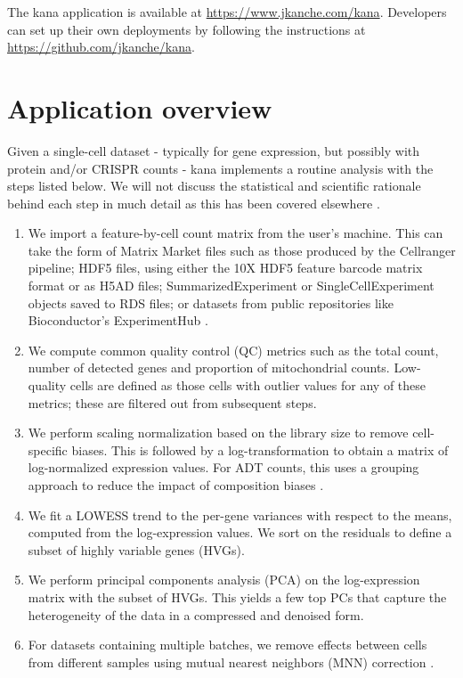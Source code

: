 \documentclass{article}
\begin{document}
The kana application is available at \url{https://www.jkanche.com/kana}.
Developers can set up their own deployments by following the instructions at \url{https://github.com/jkanche/kana}.

\section{Application overview}

Given a single-cell dataset - typically for gene expression, but possibly with protein and/or CRISPR counts - kana implements a routine analysis with the steps listed below.
We will not discuss the statistical and scientific rationale behind each step in much detail as this has been covered elsewhere \cite{oscabook}.

\begin{enumerate}
\item We import a feature-by-cell count matrix from the user's machine.
This can take the form of Matrix Market files such as those produced by the Cellranger pipeline;
HDF5 files, using either the 10X HDF5 feature barcode matrix format or as H5AD files; 
SummarizedExperiment or SingleCellExperiment objects \cite{amezquita2020orchestrating} saved to RDS files;
or datasets from public repositories like Bioconductor's ExperimentHub \cite{morgan2019experimenthub}.
\item We compute common quality control (QC) metrics such as the total count, number of detected genes and proportion of mitochondrial counts.
Low-quality cells are defined as those cells with outlier values for any of these metrics; these are filtered out from subsequent steps.
\item We perform scaling normalization based on the library size to remove cell-specific biases.
This is followed by a log-transformation to obtain a matrix of log-normalized expression values.
For ADT counts, this uses a grouping approach to reduce the impact of composition biases \cite{lun2016pooling}.
\item We fit a LOWESS trend \cite{cleveland1979robust} to the per-gene variances with respect to the means, computed from the log-expression values.
We sort on the residuals to define a subset of highly variable genes (HVGs). 
\item We perform principal components analysis (PCA) on the log-expression matrix with the subset of HVGs.
This yields a few top PCs that capture the heterogeneity of the data in a compressed and denoised form.
\item For datasets containing multiple batches, we remove effects between cells from different samples using mutual nearest neighbors (MNN) correction \cite{haghverdi2018batch}. 

\end{enumerate}
\end{document}
